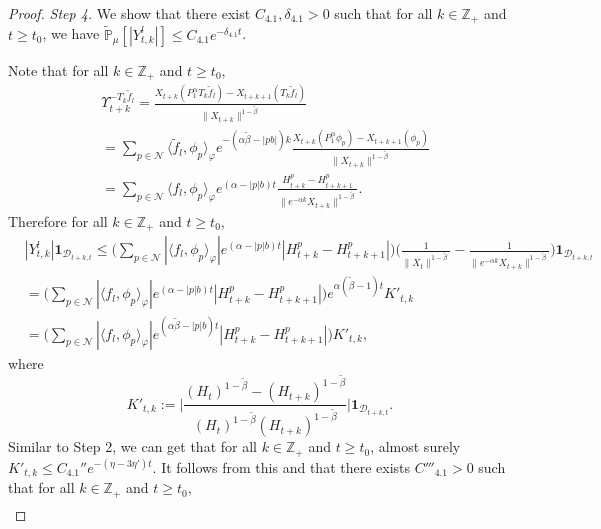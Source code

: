 \documentclass[12pt,a4paper]{amsart}
\theoremstyle{plain}
\theoremstyle{definition}
\numberwithin{equation}{section}
\begin{document}
\begin{proof}
 \emph{Step 4.} We show that there exist $C_{4.1}, \delta_{4.1}>0$ such that for all $k \in \mathbb Z_+$ and $t\geq t_0$, we have $\widetilde {\mathbb {P}}_\mu[|Y^l_{t,k}|]\leq C_{4.1}e^{- \delta_{4.1} t}$.

 Note that for all $k \in \mathbb Z_+$ and $t\geq t_ 0$,
  \begin{align}
    & \Upsilon_{t+k}^{-T_k\tilde f_l}
      = \frac{X_{t+k}(P^\alpha_1T_k\tilde f_l) - X_{t+k+1}(T_k \tilde f_l)}{\|X_{t+k}\|^{1 - \tilde \beta}}
    \\& = \sum_{p\in \mathcal N}
    \langle\tilde f_l,\phi_p\rangle_\varphi e^{-(\alpha \tilde \beta - |pb|)k}\frac{ X_{t+k}(P_1^\alpha \phi_p) - X_{t+k+1}(\phi_p)}{\|X_{t+k}\|^{1 - \tilde \beta}}
    \\& = \sum_{p\in \mathcal N}
    \langle f_l,\phi_p\rangle_\varphi  e^{(\alpha  -|p|b)t}\frac{H_{t+k}^p-H_{t+k+1}^p }{\|e^{-\alpha k}X_{t+k}\|^{1 - \tilde \beta}}.
  \end{align}
  Therefore for all $k\in \mathbb Z_+$ and $t\geq t_0$,
  \begin{align}
    &|Y^l_{t,k}| \mathbf 1_{\mathcal D_{t+k,t}}
      \leq \Big( \sum_{p\in \mathcal N}|\langle f_l,\phi_p\rangle_\varphi|  e^{(\alpha  -|p|b)t} | H_{t+k}^p-H_{t+k+1}^p |\Big) \Big( \frac{1}{\|X_t\|^{1 - \tilde \beta}} - \frac{1}{\|e^{-\alpha k}X_{t+k}\|^{1 - \tilde \beta}} \Big)\mathbf 1_{\mathcal D_{t+k,t}}
    \\ &= \Big( \sum_{p\in \mathcal N}|\langle f_l,\phi_p\rangle_\varphi|  e^{(\alpha  -|p|b)t} | H_{t+k}^p-H_{t+k+1}^p |\Big)e^{\alpha (\tilde \beta - 1)t} K'_{t,k}
    \\ &= \Big( \sum_{p\in \mathcal N}|\langle f_l,\phi_p\rangle_\varphi|  e^{(\alpha \tilde \beta  -|p|b)t} | H_{t+k}^p-H_{t+k+1}^p |\Big) K'_{t,k},
  \end{align}
  where
  \[
    K'_{t,k}
        := \Big| \frac {(H_t)^{1- \tilde \beta} - (H_{t+k})^{1 - \tilde \beta}} {(H_t)^{1 - \tilde \beta} (H_{t+k})^{ 1- \tilde \beta }} \Big| \mathbf{1}_{\mathcal{D}_{t+k,t}}.
  \]
  Similar to Step 2, we can get that for all $k\in \mathbb Z_+$ and $t\geq t_0$, almost surely $K'_{t,k} \leq C_{4.1}'' e^{- (\eta - 3\eta')t}$.
  It follows from this and \cite[Lemma 3.3]{RenSongSunZhao2019Stable} that there exists $C'''_{4.1}>0$ such that for all $k\in \mathbb Z_+$ and $t\geq t_0$,
  \begin{align}

\end{align}
\end{proof}
\end{document}
